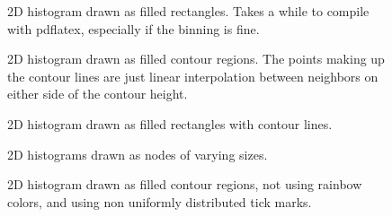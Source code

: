 \documentclass{article}
\begin{document}
\begin{figure}[H]
\centering

\captionsetup{singlelinecheck=off}
\caption[asdf]{2D histogram drawn as filled rectangles. Takes a while to compile with pdflatex, 
especially if the binning is fine.}
\end{figure}
\begin{figure}[H]
\centering

\captionsetup{singlelinecheck=off}
\caption[asdf]{2D histogram drawn as filled contour regions. The points making up the contour lines 
are just linear interpolation between neighbors on either side of the contour height.}
\end{figure}
\begin{figure}[H]
\centering

\captionsetup{singlelinecheck=off}
\caption[asdf]{2D histogram drawn as filled rectangles with contour lines.}
\end{figure}
\begin{figure}[H]
\centering

\captionsetup{singlelinecheck=off}
\caption[asdf]{2D histograms drawn as nodes of varying sizes.}
\end{figure}
\begin{figure}[H]
\centering

\captionsetup{singlelinecheck=off}
\caption[asdf]{2D histogram drawn as filled contour regions, not using rainbow colors, and using
non uniformly distributed tick marks.}
\end{figure}
\end{document}
